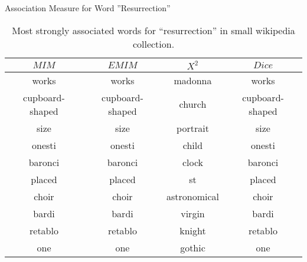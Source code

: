 \begin{table}[!htbp]
	\caption{Association Measure for Word ''Resurrection''} \label{tab:resurrection}
	\begin{center}
	\vspace{-5mm}
		\begin{tabular}{ c | c | c | c }
			\toprule
			$MIM$ & $EMIM$ & $X^2$ & $Dice$\\
			\midrule
works            & works            & madonna          & works          \\
 cupboard-shaped  & cupboard-shaped  & church           & cupboard-shaped\\
 size             & size             & portrait         & size           \\
 onesti           & onesti           & child            & onesti         \\
 baronci          & baronci          & clock            & baronci        \\
 placed           & placed           &  st               & placed         \\
 choir            & choir            & astronomical     & choir          \\
 bardi            & bardi            & virgin           & bardi          \\
 retablo          & retablo          & knight           & retablo        \\
 one              & one &   gothic           & one  \\
			\bottomrule
		\end{tabular}
	\caption*{\scriptsize Most strongly associated words for ``resurrection'' in small wikipedia collection.}
	 \end{center}
\end{table}

